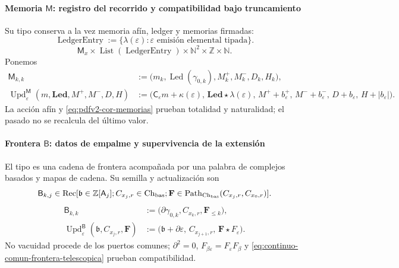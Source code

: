 \paragraph{Memoria \(\mathsf M\): registro del recorrido y compatibilidad bajo truncamiento}
Su tipo conserva a la vez memoria afín, ledger y memorias firmadas:
\begin{equation}
\label{eq:pdfv2-terminal-tipo-ledger-entry}
 \operatorname{LedgerEntry}:=
 \{\lambda(\varepsilon):\varepsilon\text{ emisión elemental tipada}\}.
\end{equation}
\[
 \mathsf M_x\times\operatorname{List}(\operatorname{LedgerEntry})
 \times\mathbb N^2\times\mathbb Z\times\mathbb N.
\]
Ponemos
\begin{align}
 \mathsf M_{k,k}&:=
 \bigl(m_k,\operatorname{Led}(\gamma_{0,k}),
       M_k^+,M_k^-,D_k,H_k\bigr),
 \label{eq:pdfv2-terminal-semilla-m}\\
 \operatorname{Upd}^{\mathsf M}_{\varepsilon}
 (m,\mathbf{Led},M^+,M^-,D,H)
 &:=
 \bigl(\mathsf C_\varepsilon m+\kappa(\varepsilon),\,
 \mathbf{Led}\star\lambda(\varepsilon),\,
 M^++b_\varepsilon^+,\,M^-+b_\varepsilon^-,\,
 D+b_\varepsilon,\,H+|b_\varepsilon|\bigr).
 \label{eq:pdfv2-terminal-update-m}
\end{align}
La acción afín y \eqref{eq:pdfv2-cor-memorias} prueban totalidad y
naturalidad; el pasado no se recalcula del último valor.

\paragraph{Frontera \(\mathsf B\): datos de empalme y supervivencia de la extensión}
El tipo es una cadena de frontera acompañada por una palabra de complejos
basados y mapas de cadena. Su semilla y actualización son
\[
 \mathsf B_{k,j}\in
 \operatorname{Rec}[\mathfrak b\in\mathbb Z[\mathsf A_j];
 C_{x_j,r}\in\operatorname{Ch}_{\rm bas};
 \mathbf F\in\operatorname{Path}_{\operatorname{Ch}_{\rm bas}}
 (C_{x_j,r},C_{x_0,r})].
\]
\begin{align}
 \mathsf B_{k,k}&:=
 \bigl(\partial\gamma_{0,k},C_{x_k,r},\mathbf F_{\leq k}\bigr),
 \label{eq:pdfv2-terminal-semilla-b}\\
 \operatorname{Upd}^{\mathsf B}_{\varepsilon}
 (\mathfrak b,C_{x_j,r},\mathbf F)
 &:=
 \bigl(\mathfrak b+\partial\varepsilon,\,
 C_{x_{j+1},r},\,\mathbf F\star F_\varepsilon\bigr).
 \label{eq:pdfv2-terminal-update-b}
\end{align}
No vacuidad procede de los puertos comunes; \(\partial^2=0\),
\(F_{\beta\varepsilon}=F_\varepsilon F_\beta\) y
\eqref{eq:continuo-comun-frontera-telescopica} prueban compatibilidad.

